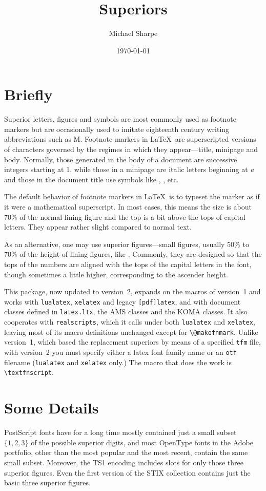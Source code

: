 \documentclass[11pt]{article}
\title{Superiors}
\author{Michael Sharpe}
\date{\today}  %
\begin{document}
\maketitle
\section*{Briefly}
Superior letters, figures and symbols are most commonly used as footnote markers but are occasionally used to imitate eighteenth century writing abbreviations such as M. Footnote markers in \LaTeX\ are superscripted versions of characters governed by the regimes in which they appear---title, minipage and body. Normally, those generated in the body of a document are successive integers starting at 1, while those in a minipage are italic letters beginning at \emph{a} and those in the document title use symbols like \textasteriskcentered, \textdagger, etc. 

The default behavior of footnote markers in \LaTeX\ is to typeset the marker as if it were a mathematical superscript. In most cases, this means the size is about 70\% of the normal lining figure and the top is a bit above the tops of capital letters. They appear rather slight compared to normal text.


As an alternative, one may use superior figures---small figures, usually 50\% to 70\% of the height of lining figures, like . Commonly, they are designed so that the tops of the numbers are aligned with the tops of the capital letters in the font, though sometimes a little higher, corresponding to the ascender height. 

This package, now updated to version~2, expands on the macros of version~1 and works with {\tt lualatex}, {\tt xelatex} and legacy {\tt [pdf]latex}, and with document classes defined in {\tt latex.ltx}, the AMS classes and the KOMA classes. It also cooperates with {\tt realscripts}, which it calls under both {\tt lualatex} and {\tt xelatex}, leaving most of its macro definitions unchanged except for \verb|\@makefnmark|. Unlike version~1, which based the replacement superiors by means of a specified {\tt tfm} file, with version~2  you must specify  either a  latex font family name or an {\tt otf} filename ({\tt lualatex} and {\tt xelatex} only.) The macro that does the work is \verb|\textfnscript|.

\section*{Some Details}
PostScript fonts have for a long time mostly contained just a small subset $\{1,2,3\}$ of the possible superior digits, and most OpenType fonts in the Adobe portfolio, other than the most popular and the most recent, contain the same small subset. Moreover, the \textsf{TS1} encoding includes slots for only those three superior figures. Even the first version of the STIX collection contains just the basic three superior figures.
\end{document}
